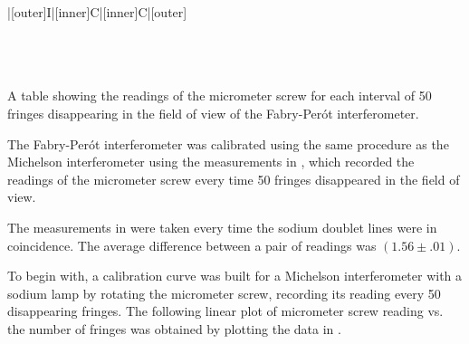\begin{paper}
{\begin{papertable}{|[outer]I|[inner]C|[inner]C|[outer]}
	    \papertableindex{}\\\paperiline
	    \papertableindex{}\\\paperiline
	    \papertableindex{}\\\paperiline
	    \papertableindex{}\\\paperoline
	\end{papertable}\vspace{-1.5em}}{A table showing the readings of the micrometer screw for each interval of 50 fringes disappearing in the field of view of the Fabry-Per\'ot interferometer.}
	
	The Fabry-Per\'ot interferometer was calibrated using the same procedure as the Michelson interferometer using the measurements in \figFP, which recorded the readings of the micrometer screw every time 50 fringes disappeared in the field of view.
	
	
	The measurements in \figDoublet were taken every time the sodium doublet lines were in coincidence. The average difference between a pair of readings was $(1.56\pm.01)$.
	
	
	To begin with, a calibration curve was built for a Michelson interferometer with a sodium lamp by rotating the micrometer screw, recording its reading every 50 disappearing fringes. The following linear plot of micrometer screw reading vs. the number of fringes was obtained by plotting the data in \figCalibrationCurve.
	

\end{paper}
